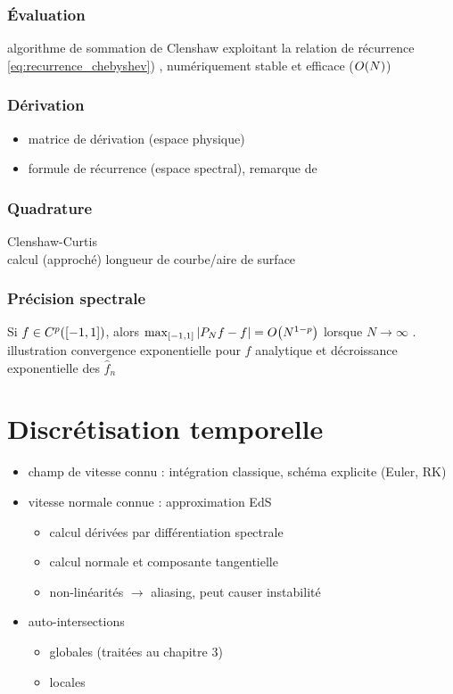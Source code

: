 \subsubsection{Évaluation}
algorithme de sommation de Clenshaw exploitant la relation de récurrence \eqref{eq:recurrence_chebyshev}) \cite{clenshaw1955}, numériquement stable et efficace ($\bigO{N}$)

\subsubsection{Dérivation}
\begin{itemize}
	\item matrice de dérivation (espace physique)
	\item formule de récurrence (espace spectral), remarque de \cite[Section 2.3, p~.94]{wengle1978}%
\end{itemize}

\subsubsection{Quadrature}
Clenshaw-Curtis\\
calcul (approché) longueur de courbe/aire de surface

\subsubsection{Précision spectrale}
Si $f \in C^p(\chebinterval)$, alors $\max_{\chebinterval} \left| \truncseries{f}{N} - f \right| = \bigO{N^{1-p}}$ lorsque $N \to \infty$ \cite[Théorème 5.14]{mason2002}.\\
illustration convergence exponentielle pour $f$ analytique et décroissance exponentielle des $\hat{f}_n$



\section{Discrétisation temporelle}
\cite{peternell1997}
\begin{itemize}
	\item champ de vitesse connu : intégration classique, schéma explicite (Euler, RK)
	\item vitesse normale connue : approximation EdS
	\begin{itemize}
		\item calcul dérivées par différentiation spectrale
		\item calcul normale et composante tangentielle
		\item non-linéarités $\to$ aliasing, peut causer instabilité \cite{rahimian2015}
	\end{itemize}
	\item auto-intersections
	\begin{itemize}
		\item globales (traitées au chapitre 3)
		\item locales \cite{farouki1986}
	\end{itemize}
\end{itemize}